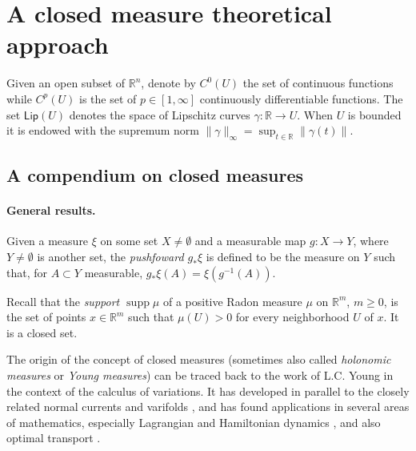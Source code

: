 \documentclass[11pt]{article}
\theoremstyle{definition}
\theoremstyle{remark}
\DeclareMathOperator{\supp}{supp}
\newcommand{\R}{\mathbb{R}}
\newcommand{\lipschitz}{\mathsf{Lip}}
\renewcommand{\geq}{\geqslant}
\begin{document}
%

%



%

%

%


\section{A closed measure theoretical approach}
\label{sec:prelims}

Given an open subset of $\R^n$, denote by $C^0(U)$ the set of continuous functions while $C^p(U)$ is the set of $p\in [1,\infty]$ continuously differentiable functions. The set $\lipschitz (U)$ denotes the space of Lipschitz curves $\gamma\colon\R\to U$. When $U$ is bounded it is endowed with the supremum norm $\|\gamma\|_\infty=\sup_{t\in\R}\|\gamma(t)\|$. 
\subsection{A compendium on closed measures}
\label{sec:closedmeas}


\paragraph{General results.}



Given a measure $\xi$ on some set $X\neq \emptyset$ and a measurable map $g\colon X\to Y$, where $Y\neq\emptyset$ is another set, the \emph{pushfoward $g_*\xi$} is defined to be the measure on $Y$ such that, for $A\subset Y$ measurable, $g_*\xi(A)=\xi(g^{-1}(A))$.

Recall that the \emph{support $\supp\mu$} of a positive Radon measure $\mu$ on $\R^m$, $m\geq 0$,  is the set of points $x\in \R^m$ such that $\mu(U)>0$ for every neighborhood $U$ of $x$. It is a closed set.

The origin of the concept of closed measures (sometimes also called {\em holonomic measures} or {\em Young measures}) can be traced back to the work of L.C. Young \cite{young1969,young1937generalized} in the context of the calculus of variations. It has developed in parallel to the closely related normal currents \cite{federer,federerbook} and varifolds \cite{almgrenvarifolds,allard}, and has found applications in several areas of mathematics, especially Lagrangian and Hamiltonian dynamics \cite{matheractionminimizing91,manhe,contrerasiturriagabook,sorrentino2015action}, and also optimal transport \cite{patrick,bernardbuffoni}. 
\end{document}
